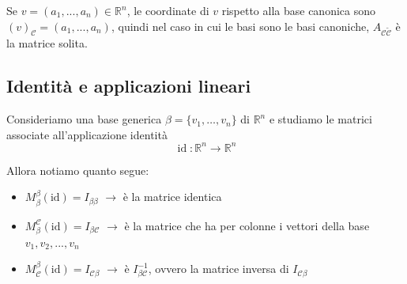 \documentclass[
  a4paper,
]{article}
\providecommand{\tightlist}{%
  \setlength{\itemsep}{0pt}\setlength{\parskip}{0pt}}
\providecommand{\tightlist}{}
\begin{document}
\begin{observationbox}
Se \(v = (a_1, ..., a_n) \in \mathbb{R}^n\), le coordinate di \(v\)
rispetto alla base canonica sono
\((v)_{\mathcal{C}} = (a_1, ... ,a_n)\), quindi nel caso in cui le basi
sono le basi canoniche, \(A_{\mathcal{C} \widetilde{\mathcal{C}}}\) è la
matrice solita.
\end{observationbox}

\hypertarget{identituxe0-e-applicazioni-lineari}{%
\subsection{Identità e applicazioni
lineari}\label{identituxe0-e-applicazioni-lineari}}

Consideriamo una base generica \(\beta = \{v_1, \dots, v_n\}\) di
\(\mathbb{R}^n\) e studiamo le matrici associate all'applicazione
identità\\
\[  
\operatorname{id}:\mathbb R^n\to\mathbb R^n 
\]

Allora notiamo quanto segue:

\begin{propositionbox}
\begin{itemize}
\tightlist
\item
  \(M^{\beta}_{\beta}(\text{id}) = I_{\beta \beta}\) \(\to\) è la
  matrice identica
\item
  \(M^{\mathcal{C}}_{\beta}(\text{id}) = I_{\beta \mathcal{C}}\) \(\to\)
  è la matrice che ha per colonne i vettori della base
  \(v_1, v_2, ..., v_n\)
\item
  \(M^{\beta}_{\mathcal{C}}(\text{id}) = I_{\mathcal{C} \beta}\) \(\to\)
  è \(I_{\beta\mathcal{C}}^{-1}\), ovvero la matrice inversa di
  \(I_{\mathcal{C} \beta}\)
\end{itemize}
\end{propositionbox}
\end{document}
